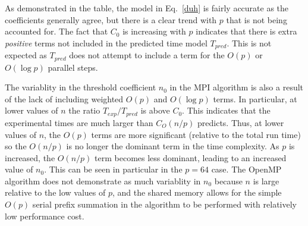 \documentclass[12pt]{article}
\begin{document}
{{{As demonstrated in the table, the model in
Eq.~\eqref{duh} is fairly accurate as the coefficients generally agree, but there is
a clear trend with $p$ that is not being accounted for.  The fact that $C_0$ is increasing
with $p$ indicates that there is extra \emph{positive} terms not included in the
predicted time model $T_{pred}$.  This is not expected as $T_{pred}$ does not attempt
to include a term for the $O(p)$ or $O(\log p)$ parallel steps.   

The variablity in the threshold coefficient $n_0$ in the MPI algorithm is also a result of the lack of
including weighted $O(p)$ and $O(\log p)$ terms.  In particular, at lower values of
$n$ the ratio $T_{exp}/T_{pred}$ is above $C_0$.  This indicates that the
experimental times are much larger than $C_O(n/p)$ predicts.  Thus, at lower values of
$n$, the $O(p)$ terms are more significant (relative to the total run time) so the
$O(n/p)$ is no longer the dominant term in the time complexity.  As $p$ is increased,
the $O(n/p)$ term becomes less dominant, leading to an increased value of $n_0$. This
can be seen in particular in the $p=64$ case.  The OpenMP algorithm does not
demonstrate as much variablity in $n_0$ because $n$ is large relative to the low
values of $p$, and the shared memory allows for the simple $O(p)$ serial prefix
summation in the algorithm to be performed with relatively low performance cost.

}}}
\end{document}
